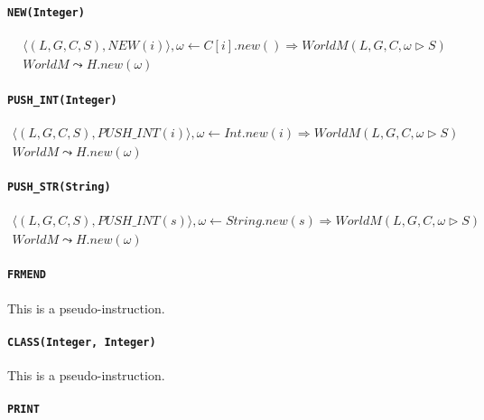 \documentclass[]{article}
\numberwithin{equation}{section}
\numberwithin{figure}{section}
\numberwithin{table}{section}
\begin{document}
\paragraph{\texttt{NEW(Integer)}}\label{newinteger}

\begin{gather*}
  \langle (L, G, C, S), NEW(i)\rangle, \omega \leftarrow C[i].new() \Rightarrow WorldM (L, G, C, \omega \rhd S)\\
  WorldM \leadsto H.new(\omega)
\end{gather*}

\paragraph{\texttt{PUSH\_INT(Integer)}}\label{pushux5fintinteger}

\begin{gather*}
  \langle (L, G, C, S), PUSH\_INT(i)\rangle, \omega \leftarrow Int.new(i) \Rightarrow WorldM (L, G, C, \omega \rhd S)\\
  WorldM \leadsto H.new(\omega)
\end{gather*}

\paragraph{\texttt{PUSH\_STR(String)}}\label{pushux5fstrstring}

\begin{gather*}
  \langle (L, G, C, S), PUSH\_INT(s)\rangle, \omega \leftarrow String.new(s) \Rightarrow WorldM (L, G, C, \omega \rhd S)\\
  WorldM \leadsto H.new(\omega)
\end{gather*}

\paragraph{\texttt{FRMEND}}\label{frmend}

This is a pseudo-instruction.

\paragraph{\texttt{CLASS(Integer, Integer)}}\label{classinteger-integer}

This is a pseudo-instruction.

\paragraph{\texttt{PRINT}}\label{print}
\end{document}
